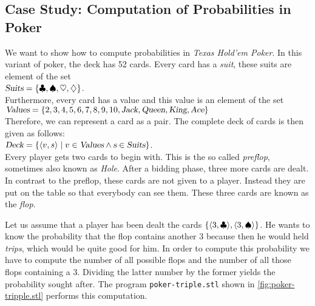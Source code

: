 \subsection{Case Study: Computation of Probabilities in Poker}
We want to show how to compute probabilities in \textsl{Texas Hold'em Poker}.  
In this variant of poker, the deck has  52 cards.  Every card has a \emph{suit}, these
suits are element of the set
\\[0.2cm]
\hspace*{1.3cm} $\textsl{Suits} = \{ \clubsuit , \spadesuit , \heartsuit , \diamondsuit \}$.
\\[0.2cm]
Furthermore, every card has a value and this value is an element of the set
\\[0.2cm]
\hspace*{1.3cm} $\textsl{Values} = \{ 2, 3, 4, 5, 6, 7, 8, 9, 10, \textsl{Jack}, \textsl{Queen},
\textsl{King}, \textsl{Ace} \}$
\\[0.2cm]
Therefore, we can represent a card as a pair.  The complete deck of cards is then given as
follows:
\\[0.2cm]
\hspace*{1.3cm} 
$\textsl{Deck} = \{ \pair(v,s) \mid v \in \textsl{Values} \wedge \textsl{s} \in \textsl{Suits} \}$.
\\[0.2cm]
Every player gets two cards to begin with.  This is the so called  \emph{preflop},
sometimes also known as \emph{Hole}.  After a bidding phase, three more cards are dealt.
In contrast to the preflop, these cards are not given to a player.  Instead they are put
on the table so that everybody can see them.  These three cards are known as the
\textsl{flop}.

Let us assume that a player has been dealt the cards $\{ \pair(3, \club), \pair(3, \spade)
\}$.
He wants to know the probability that the flop contains another 3
because then he would held \emph{trips}, which would be quite good for him.
In order to compute this probability we have to compute the number of all possible flops
and the number of all those flops containing a 3.  Dividing the latter number by the
former yields the probability sought after.
The program \texttt{poker-triple.stl} shown in
 \ref{fig:poker-tripple.stl} performs this computation.

